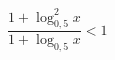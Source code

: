 \begin{ex}[type=inequality]
	\begin{condition}
		\( \dfrac{1+\log^2_{0,5}x}{1+\log_{0,5}x}<1\)
	\end{condition}
\end{ex}